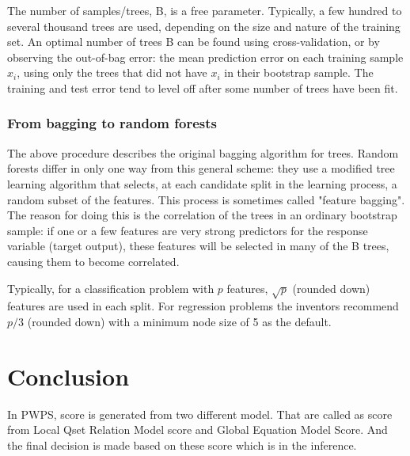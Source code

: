 \documentclass[document.tex]{subfiles}
\begin{document}
The number of samples/trees, B, is a free parameter. Typically, a few hundred to several thousand trees are used, depending on the size and nature of the training set. An optimal number of trees B can be found using cross-validation, or by observing the out-of-bag error: the mean prediction error on each training sample $x_i$, using only the trees that did not have $x_i$ in their bootstrap sample. The training and test error tend to level off after some number of trees have been fit.

\subsubsection{From bagging to random forests}
The above procedure describes the original bagging algorithm for trees. Random forests differ in only one way from this general scheme: they use a modified tree learning algorithm that selects, at each candidate split in the learning process, a random subset of the features. This process is sometimes called "feature bagging". The reason for doing this is the correlation of the trees in an ordinary bootstrap sample: if one or a few features are very strong predictors for the response variable (target output), these features will be selected in many of the B trees, causing them to become correlated.

Typically, for a classification problem with $p$ features, $\sqrt{p}$ (rounded down) features are used in each split. For regression problems the inventors recommend $p/3$ (rounded down) with a minimum node size of 5 as the default.



\section{Conclusion}
In PWPS, score is generated from two different model. That are called as score from Local Qset Relation Model score and Global Equation Model Score. And the final decision is made based on these score which is in the inference.
\end{document}
